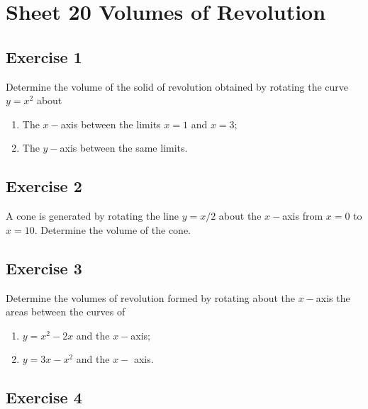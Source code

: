 \documentclass[
  english,
  11pt,
  oneside]{book}
\providecommand{\tightlist}{%
  \setlength{\itemsep}{0pt}\setlength{\parskip}{0pt}}
\newcommand{\slide}{}
\theoremstyle{definition}
\theoremstyle{definition}
\theoremstyle{definition}
\theoremstyle{definition}
\theoremstyle{remark}
\begin{document}
\section{Sheet 20 Volumes of Revolution}\label{sheet-20-volumes-of-revolution}

\slide

\subsection*{Exercise 1}\label{exercise-1-10}

Determine the volume of the solid of revolution obtained by rotating the curve \(y = x^2\) about

\begin{enumerate}
\def\labelenumi{\roman{enumi}.}
\tightlist
\item
  The \(x-\)axis between the limits \(x = 1\) and \(x = 3\);
\item
  The \(y-\)axis between the same limits.
\end{enumerate}

\slide

\subsection*{Exercise 2}\label{exercise-2-10}

A cone is generated by rotating the line \(y = x/2\) about the \(x-\)axis from \(x = 0\) to \(x = 10\). Determine the volume of the cone.

\slide

\subsection*{Exercise 3}\label{exercise-3-8}

Determine the volumes of revolution formed by rotating about the \(x-\)axis the areas between the curves of

\begin{enumerate}
\def\labelenumi{\roman{enumi}.}
\tightlist
\item
  \(y = x^2 - 2x\) and the \(x-\)axis;
\item
  \(y = 3x - x^2\) and the \(x-\) axis.
\end{enumerate}

\slide

\subsection*{Exercise 4}\label{exercise-4-6}
\end{document}
